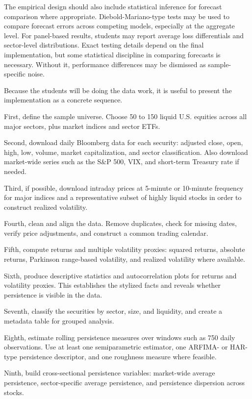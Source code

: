 \documentclass[12pt]{article}
\begin{document}
The empirical design should also include statistical inference for forecast comparison where appropriate. Diebold-Mariano-type tests may be used to compare forecast errors across competing models, especially at the aggregate level. For panel-based results, students may report average loss differentials and sector-level distributions. Exact testing details depend on the final implementation, but some statistical discipline in comparing forecasts is necessary. Without it, performance differences may be dismissed as sample-specific noise.

Because the students will be doing the data work, it is useful to present the implementation as a concrete sequence.

First, define the sample universe. Choose 50 to 150 liquid U.S. equities across all major sectors, plus market indices and sector ETFs.

Second, download daily Bloomberg data for each security: adjusted close, open, high, low, volume, market capitalization, and sector classification. Also download market-wide series such as the S&P 500, VIX, and short-term Treasury rate if needed.

Third, if possible, download intraday prices at 5-minute or 10-minute frequency for major indices and a representative subset of highly liquid stocks in order to construct realized volatility.

Fourth, clean and align the data. Remove duplicates, check for missing dates, verify price adjustments, and construct a common trading calendar.

Fifth, compute returns and multiple volatility proxies: squared returns, absolute returns, Parkinson range-based volatility, and realized volatility where available.

Sixth, produce descriptive statistics and autocorrelation plots for returns and volatility proxies. This establishes the stylized facts and reveals whether persistence is visible in the data.

Seventh, classify the securities by sector, size, and liquidity, and create a metadata table for grouped analysis.

Eighth, estimate rolling persistence measures over windows such as 750 daily observations. Use at least one semiparametric estimator, one ARFIMA- or HAR-type persistence descriptor, and one roughness measure where feasible.

Ninth, build cross-sectional persistence variables: market-wide average persistence, sector-specific average persistence, and persistence dispersion across stocks.
\end{document}
